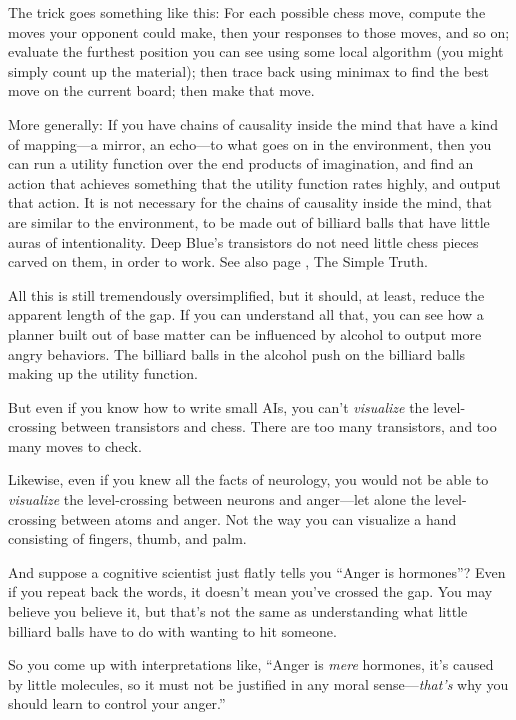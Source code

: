 {
 The trick goes something like this: For each possible chess move,
compute the moves your opponent could make, then your responses to
those moves, and so on; evaluate the furthest position you can see
using some local algorithm (you might simply count up the material);
then trace back using minimax to find the best move on the current
board; then make that move.}

{
 More generally: If you have chains of causality inside the mind
that have a kind of mapping---a mirror, an echo---to what goes on in
the environment, then you can run a utility function over the end
products of imagination, and find an action that achieves something
that the utility function rates highly, and output that action. It is
not necessary for the chains of causality inside the mind, that are
similar to the environment, to be made out of billiard balls that have
little auras of intentionality. Deep Blue's transistors
do not need little chess pieces carved on them, in order to work. See
also page \pageref{the_simple_truth}, The Simple Truth.}

{
 All this is still tremendously oversimplified, but it should, at
least, reduce the apparent length of the gap. If you can understand all
that, you can see how a planner built out of base matter can be
influenced by alcohol to output more angry behaviors. The billiard
balls in the alcohol push on the billiard balls making up the utility
function.}

{
 But even if you know how to write small AIs, you
can't \textit{visualize} the level-crossing between
transistors and chess. There are too many transistors, and too many
moves to check.}

{
 Likewise, even if you knew all the facts of neurology, you would
not be able to \textit{visualize} the level-crossing between neurons
and anger---let alone the level-crossing between atoms and anger. Not
the way you can visualize a hand consisting of fingers, thumb, and
palm.}

{
 And suppose a cognitive scientist just flatly tells you
``Anger is hormones''? Even if you
repeat back the words, it doesn't mean
you've crossed the gap. You may believe you believe it,
but that's not the same as understanding what little
billiard balls have to do with wanting to hit someone.}

{
 So you come up with interpretations like, ``Anger
is \textit{mere} hormones, it's caused by little
molecules, so it must not be justified in any moral
sense---\textit{that's} why you should learn to control
your anger.''}

